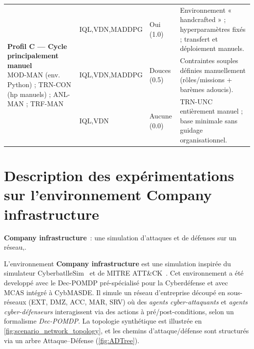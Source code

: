 \begin{table}[h!]
\begin{tabularx}{\textwidth}{p{3.8cm}p{2.5cm}p{2.8cm}p{4.5cm}}
    \midrule
    \multirow{3}{*}{\parbox{3.8cm}{\textbf{Profil C — Cycle principalement manuel}                                                                                                                               \\MOD-MAN (env. Python) ; TRN-CON (hp manuels) ; ANL-MAN ; TRF-MAN}}
                                      & IQL,\;VDN,\;MADDPG        & Oui (1.0)                          & Environnement « handcrafted » ; hyperparamètres fixés ; transfert et déploiement manuels.               \\
                                      & IQL,\;VDN,\;MADDPG        & Douces (0.5)                       & Contraintes souples définies manuellement (rôles/missions + barèmes adoucis).                           \\
                                      & IQL,\;VDN                 & Aucune (0.0)                       & TRN-UNC entièrement manuel ; base minimale sans guidage organisationnel.                                \\
    \bottomrule
  \end{tabularx}
\end{table}



\section{Description des expérimentations sur l'environnement Company infrastructure}
\textbf{Company infrastructure}~\cite{cyberbattlesim}: une simulation d’attaques et de défenses sur un réseau,.

L'environnement \textbf{Company infrastructure} est une simulation inspirée du simulateur CyberbatlleSim~\cite{cyberbattlesim} et de MITRE ATT\&CK~\cite{MITREATTACKWebiste}. Cet environnement a été developpé avec le Dec-POMDP pré-spécialisé pour la Cyberdéfense et avec MCAS intégré à CybMASDE. Il simule un réseau d’entreprise découpé en sous-réseaux (EXT, DMZ, ACC, MAR, SRV) où des \emph{agents cyber-attaquants} et \emph{agents cyber-défenseurs} interagissent via des actions à pré/post-conditions, selon un formalisme \emph{Dec-POMDP}. La topologie synthétique est illustrée en \autoref{fig:scenario_network_topology}, et les chemins d’attaque/défense sont structurés via un arbre Attaque–Défense (\autoref{fig:ADTree}).

